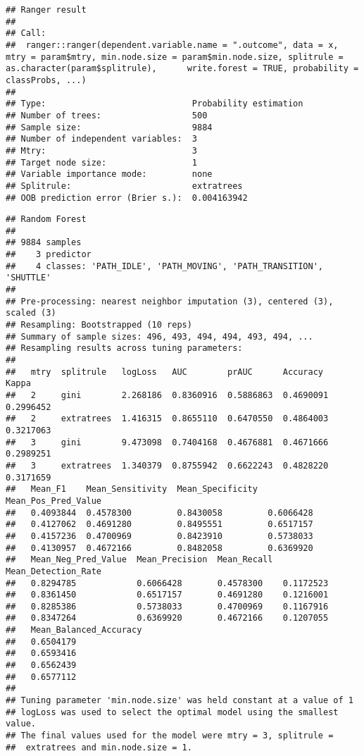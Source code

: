 \documentclass[]{article}
\begin{document}
\begin{verbatim}
## Ranger result
## 
## Call:
##  ranger::ranger(dependent.variable.name = ".outcome", data = x,      mtry = param$mtry, min.node.size = param$min.node.size, splitrule = as.character(param$splitrule),      write.forest = TRUE, probability = classProbs, ...) 
## 
## Type:                             Probability estimation 
## Number of trees:                  500 
## Sample size:                      9884 
## Number of independent variables:  3 
## Mtry:                             3 
## Target node size:                 1 
## Variable importance mode:         none 
## Splitrule:                        extratrees 
## OOB prediction error (Brier s.):  0.004163942
\end{verbatim}

\begin{verbatim}
## Random Forest 
## 
## 9884 samples
##    3 predictor
##    4 classes: 'PATH_IDLE', 'PATH_MOVING', 'PATH_TRANSITION', 'SHUTTLE' 
## 
## Pre-processing: nearest neighbor imputation (3), centered (3), scaled (3) 
## Resampling: Bootstrapped (10 reps) 
## Summary of sample sizes: 496, 493, 494, 494, 493, 494, ... 
## Resampling results across tuning parameters:
## 
##   mtry  splitrule   logLoss   AUC        prAUC      Accuracy   Kappa    
##   2     gini        2.268186  0.8360916  0.5886863  0.4690091  0.2996452
##   2     extratrees  1.416315  0.8655110  0.6470550  0.4864003  0.3217063
##   3     gini        9.473098  0.7404168  0.4676881  0.4671666  0.2989251
##   3     extratrees  1.340379  0.8755942  0.6622243  0.4828220  0.3171659
##   Mean_F1    Mean_Sensitivity  Mean_Specificity  Mean_Pos_Pred_Value
##   0.4093844  0.4578300         0.8430058         0.6066428          
##   0.4127062  0.4691280         0.8495551         0.6517157          
##   0.4157236  0.4700969         0.8423910         0.5738033          
##   0.4130957  0.4672166         0.8482058         0.6369920          
##   Mean_Neg_Pred_Value  Mean_Precision  Mean_Recall  Mean_Detection_Rate
##   0.8294785            0.6066428       0.4578300    0.1172523          
##   0.8361450            0.6517157       0.4691280    0.1216001          
##   0.8285386            0.5738033       0.4700969    0.1167916          
##   0.8347264            0.6369920       0.4672166    0.1207055          
##   Mean_Balanced_Accuracy
##   0.6504179             
##   0.6593416             
##   0.6562439             
##   0.6577112             
## 
## Tuning parameter 'min.node.size' was held constant at a value of 1
## logLoss was used to select the optimal model using the smallest value.
## The final values used for the model were mtry = 3, splitrule =
##  extratrees and min.node.size = 1.
\end{verbatim}
\end{document}
